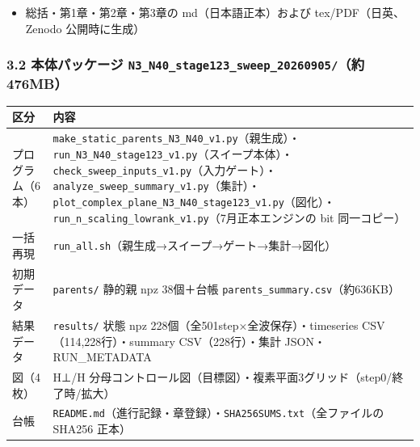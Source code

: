\documentclass[
  a4paper,
]{ltjsarticle}
\newcounter{none} %
\providecommand{\tightlist}{%
  \setlength{\itemsep}{0pt}\setlength{\parskip}{0pt}}
\begin{document}
\begin{itemize}
\tightlist
\item
  総括・第1章・第2章・第3章の md（日本語正本）および
  tex/PDF（日英、Zenodo 公開時に生成）
\end{itemize}

\subsubsection{\texorpdfstring{3.2 本体パッケージ
\texttt{N3\_N40\_stage123\_sweep\_20260905/}（約476MB）}{3.2 本体パッケージ N3\_N40\_stage123\_sweep\_20260905/（約476MB）}}\label{ux672cux4f53ux30d1ux30c3ux30b1ux30fcux30b8-n3_n40_stage123_sweep_20260905ux7d04476mb}

{\def\LTcaptype{none} %
\begin{longtable}[]{@{}
  >{\raggedright\arraybackslash}p{}
  >{\raggedright\arraybackslash}p{}@{}}
\toprule\noalign{}
\begin{minipage}[b]{\linewidth}\raggedright
区分
\end{minipage} & \begin{minipage}[b]{\linewidth}\raggedright
内容
\end{minipage} \\
\midrule\noalign{}
\endhead
\bottomrule\noalign{}
\endlastfoot
プログラム（6本） &
\texttt{make\_static\_parents\_N3\_N40\_v1.py}（親生成）・\texttt{run\_N3\_N40\_stage123\_v1.py}（スイープ本体）・\texttt{check\_sweep\_inputs\_v1.py}（入力ゲート）・\texttt{analyze\_sweep\_summary\_v1.py}（集計）・\texttt{plot\_complex\_plane\_N3\_N40\_stage123\_v1.py}（図化）・\texttt{run\_n\_scaling\_lowrank\_v1.py}（7月正本エンジンの
bit 同一コピー） \\
一括再現 & \texttt{run\_all.sh}（親生成→スイープ→ゲート→集計→図化） \\
初期データ & \texttt{parents/} 静的親 npz 38個＋台帳
\texttt{parents\_summary.csv}（約636KB） \\
結果データ & \texttt{results/} 状態 npz
228個（全501step×全波保存）・timeseries CSV（114,228行）・summary
CSV（228行）・集計 JSON・RUN\_METADATA \\
図（4枚） & H⊥/H
分母コントロール図（目標図）・複素平面3グリッド（step0/終了時/拡大） \\
台帳 &
\texttt{README.md}（進行記録・章登録）・\texttt{SHA256SUMS.txt}（全ファイルの
SHA256 正本） \\
\end{longtable}
}
\end{document}
